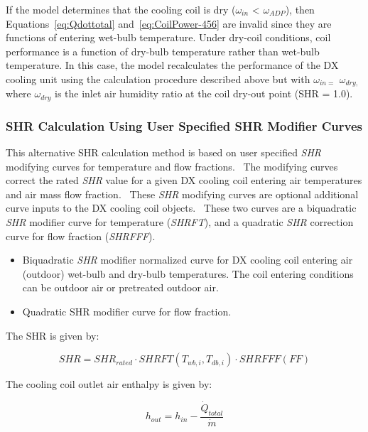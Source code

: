 If the model determines that the cooling coil is dry (\(\omega_{in}\) \textless{} \(\omega_{ADP}\)), then Equations~\ref{eq:Qdottotal} and~\ref{eq:CoilPower-456} are invalid since they are functions of entering wet-bulb temperature. Under dry-coil conditions, coil performance is a function of dry-bulb temperature rather than wet-bulb temperature. In this case, the model recalculates the performance of the DX cooling unit using the calculation procedure described above but with \(\omega_{in =}\) \(\omega_{dry,}\) where \(\omega_{dry}\) is the inlet air humidity ratio at the coil dry-out point (SHR = 1.0).

\subsubsection{SHR Calculation Using User Specified SHR Modifier Curves}\label{shr-calculation-using-user-specified-shr-modifier-curves}

This alternative SHR calculation method is based on user specified \emph{SHR} modifying curves for temperature and flow fractions.~ The modifying curves correct the rated \emph{SHR} value for a given DX cooling coil entering air temperatures and air mass flow fraction.~ These \emph{SHR} modifying curves are optional additional curve inputs to the DX cooling coil objects.~ These two curves are a biquadratic \emph{SHR} modifier curve for temperature (\emph{SHRFT}), and a quadratic \emph{SHR} correction curve for flow fraction (\emph{SHRFFF}).

\begin{itemize}
\item Biquadratic \emph{SHR} modifier normalized curve for DX cooling coil entering air (outdoor) wet-bulb and dry-bulb temperatures. The coil entering conditions can be outdoor air or pretreated outdoor air.
\item Quadratic SHR modifier curve for flow fraction.
\end{itemize}

The SHR is given by:

\begin{equation}
SHR = SH{R_{rated}} \cdot SHRFT\left( {{T_{wb,i}},{T_{db,i}}} \right) \cdot SHRFFF\left( {FF} \right)
\end{equation}

The cooling coil outlet air enthalpy is given by:

\begin{equation}
{h_{out}} = {h_{in}} - \frac{{{{\dot Q}_{total}}}}{{\dot m}}
\end{equation}

